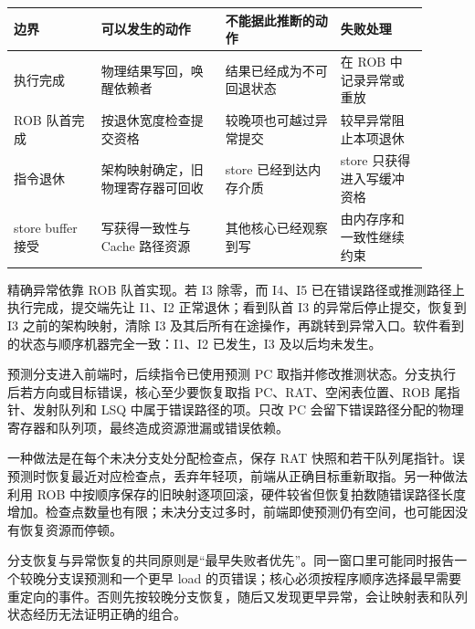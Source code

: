 \begin{longtable}{L{0.19\linewidth}L{0.27\linewidth}L{0.25\linewidth}L{0.19\linewidth}}
\toprule
边界 & 可以发生的动作 & 不能据此推断的动作 & 失败处理 \\
\midrule
执行完成 & 物理结果写回，唤醒依赖者 & 结果已经成为不可回退状态 & 在 ROB 中记录异常或重放 \\\tablerowrule
ROB 队首完成 & 按退休宽度检查提交资格 & 较晚项也可越过异常提交 & 较早异常阻止本项退休 \\\tablerowrule
指令退休 & 架构映射确定，旧物理寄存器可回收 & store 已经到达内存介质 & store 只获得进入写缓冲资格 \\\tablerowrule
store buffer 接受 & 写获得一致性与 Cache 路径资源 & 其他核心已经观察到写 & 由内存序和一致性继续约束 \\
\bottomrule
\end{longtable}

精确异常依靠 ROB 队首实现。若 I3 除零，而 I4、I5 已在错误路径或推测路径上执行完成，提交端先让 I1、I2 正常退休；看到队首 I3 的异常后停止提交，恢复到 I3 之前的架构映射，清除 I3 及其后所有在途操作，再跳转到异常入口。软件看到的状态与顺序机器完全一致：I1、I2 已发生，I3 及以后均未发生。


预测分支进入前端时，后续指令已使用预测 PC 取指并修改推测状态。分支执行后若方向或目标错误，核心至少要恢复取指 PC、RAT、空闲表位置、ROB 尾指针、发射队列和 LSQ 中属于错误路径的项。只改 PC 会留下错误路径分配的物理寄存器和队列项，最终造成资源泄漏或错误依赖。

一种做法是在每个未决分支处分配检查点，保存 RAT 快照和若干队列尾指针。误预测时恢复最近对应检查点，丢弃年轻项，前端从正确目标重新取指。另一种做法利用 ROB 中按顺序保存的旧映射逐项回滚，硬件较省但恢复拍数随错误路径长度增加。检查点数量也有限；未决分支过多时，前端即使预测仍有空间，也可能因没有恢复资源而停顿。

分支恢复与异常恢复的共同原则是“最早失败者优先”。同一窗口里可能同时报告一个较晚分支误预测和一个更早 load 的页错误；核心必须按程序顺序选择最早需要重定向的事件。否则先按较晚分支恢复，随后又发现更早异常，会让映射表和队列状态经历无法证明正确的组合。




























